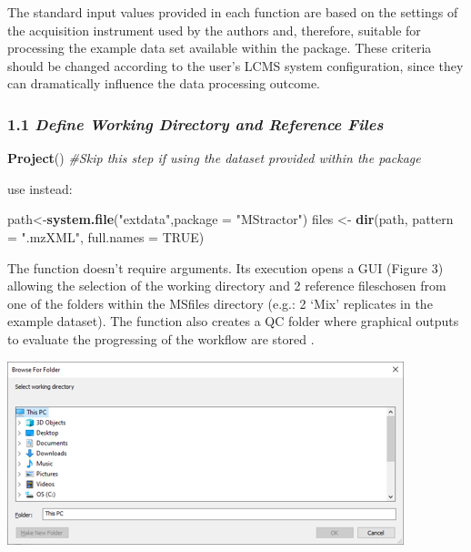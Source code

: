 \documentclass[
]{article}
\newenvironment{Shaded}{\begin{snugshade}}{\end{snugshade}}
\newcommand{\CommentTok}[1]{\textcolor[rgb]{0.56,0.35,0.01}{\textit{#1}}}
\newcommand{\DataTypeTok}[1]{\textcolor[rgb]{0.13,0.29,0.53}{#1}}
\newcommand{\KeywordTok}[1]{\textcolor[rgb]{0.13,0.29,0.53}{\textbf{#1}}}
\newcommand{\NormalTok}[1]{#1}
\newcommand{\OtherTok}[1]{\textcolor[rgb]{0.56,0.35,0.01}{#1}}
\newcommand{\StringTok}[1]{\textcolor[rgb]{0.31,0.60,0.02}{#1}}
\begin{document}
The standard input values provided in each function are based on the
settings of the acquisition instrument used by the authors and,
therefore, suitable for processing the example data set available within
the package. These criteria should be changed according to the user's
LCMS system configuration, since they can dramatically influence the
data processing outcome.

\hypertarget{define-working-directory-and-reference-files}{%
\subsubsection{\texorpdfstring{1.1 \emph{Define Working Directory and
Reference
Files}}{1.1 Define Working Directory and Reference Files}}\label{define-working-directory-and-reference-files}}

\begin{Shaded}
\begin{Highlighting}[]
\KeywordTok{Project}\NormalTok{()}
\CommentTok{\#Skip this step if using the dataset provided within the package }
\end{Highlighting}
\end{Shaded}

use instead:

\begin{Shaded}
\begin{Highlighting}[]
\NormalTok{path<{-}}\KeywordTok{system.file}\NormalTok{(}\StringTok{"extdata"}\NormalTok{,}\DataTypeTok{package =} \StringTok{"MStractor"}\NormalTok{)}
\NormalTok{files <{-}}\StringTok{ }\KeywordTok{dir}\NormalTok{(path, }\DataTypeTok{pattern =} \StringTok{".mzXML"}\NormalTok{, }\DataTypeTok{full.names =} \OtherTok{TRUE}\NormalTok{)}
\end{Highlighting}
\end{Shaded}

The function doesn't require arguments. Its execution opens a GUI
(Figure 3) allowing the selection of the working directory and 2
reference fileschosen from one of the folders within the MSfiles
directory (e.g.: 2 `Mix' replicates in the example dataset). The
function also creates a QC folder where graphical outputs to evaluate
the progressing of the workflow are stored .

\includegraphics{./selectwd.png}
\end{document}
